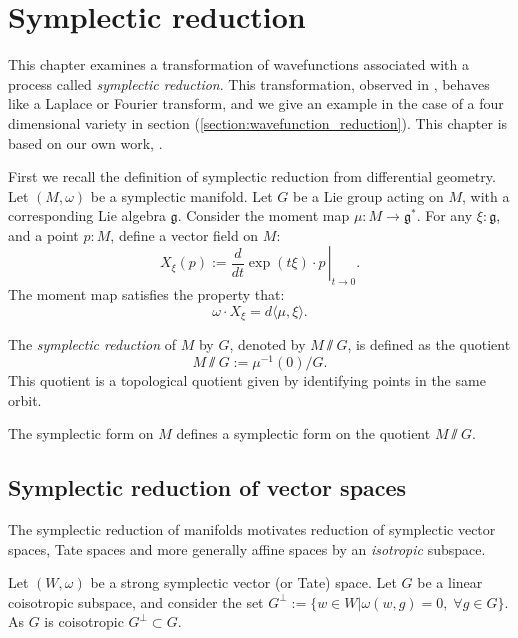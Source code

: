     \chapter{Symplectic reduction}
    \label{chapter:symplecticreduction}
    
    This chapter examines a transformation of wavefunctions associated with a process called \emph{symplectic reduction}. This transformation, observed in \cite{ks_airy}, behaves like a Laplace or Fourier transform, and we give an example in the case of a four dimensional variety in section (\ref{section:wavefunction_reduction}). This chapter is based on our own work, \cite{swaddledef}.
    
    First we recall the definition  of symplectic reduction from differential geometry. Let \( (M,\omega) \) be a symplectic manifold. Let \(G\) be a Lie group acting on \(M\), with a corresponding Lie algebra \( \mathfrak{g}\). Consider the moment map \( \mu : M \rightarrow \mathfrak{g}^*\).  For any \( \xi : \mathfrak{g}\), and a point \( p : M\), define a vector field on \(M\):
    \[ X_\xi(p) := \left. \frac{d}{dt} \exp( t \xi)  \cdot p \, \right|_{t\rightarrow 0}.\] 
    The moment map satisfies the property that:
    \[ \omega \cdot X_\xi = d \langle \mu, \xi \rangle. \]
    
    \begin{defn}
    \label{defn:symplredmani}
    The \emph{symplectic reduction} of \(M\) by \(G\), denoted by \(M \sslash G \), is defined as the quotient 
    \[M \sslash G := \mu^{-1}(0) / G .\] 
    This quotient is a topological quotient given by identifying points in the same orbit.
    \end{defn}
    
    \begin{lem}
    The symplectic form on \(M\) defines a symplectic form on the quotient \(M \sslash G\).
    \end{lem} 
    
    \section{Symplectic reduction of vector spaces}
    
    The symplectic reduction of manifolds motivates reduction of symplectic vector spaces, Tate spaces and more generally affine spaces by an \emph{isotropic} subspace.
    
    Let \( (W, \omega)\) be a strong symplectic vector (or Tate) space. Let \( G\) be a linear coisotropic subspace, and consider the set \( G^\perp := \{ w  \in W | \omega(w,g)=0, \; \forall g \in G\} \). As \(G\) is coisotropic \(G^{\perp} \subset G\).
    
